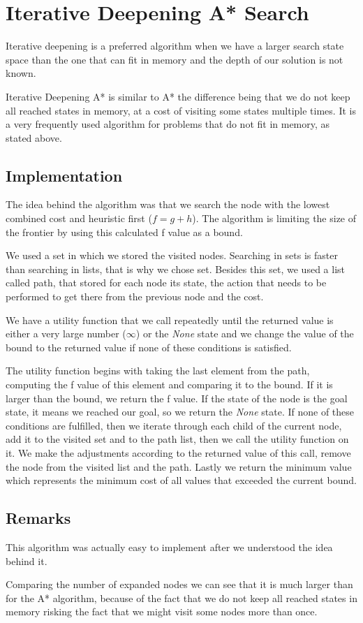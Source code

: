 \chapter{Iterative Deepening A* Search}
\label{sec:idastar}

Iterative deepening is a preferred algorithm when we have a larger search state space than the one that can fit in memory and the depth of our solution is not known. 

Iterative Deepening A* is similar to A* the difference being that we do not keep all reached states in memory, at a cost of visiting some states multiple times. It is a very frequently used algorithm for problems that do not fit in memory, as stated above.

\section{Implementation}

The idea behind the algorithm was that we search the node with the lowest combined cost and heuristic first ($f = g + h$). The algorithm is limiting the size of the frontier by using this calculated f value as a bound.

We used a set in which we stored the visited nodes. Searching in sets is faster than searching in lists, that is why we chose set.
Besides this set, we used a list called path, that stored for each node its state, the action that needs to be performed to get there from the previous node and the cost.

We have a utility function that we call repeatedly until the returned value is either a very large number ($\infty$)  or  the \textit{None} state and we change the value of the bound to the returned value if none of these conditions is satisfied. 

The utility function begins with taking the last element from the path, computing the f value of this element and comparing it to the bound. If it is larger than the bound, we return the f value. If the state of the node is the goal state, it means we reached our goal, so we return the \textit{None} state. If none of these conditions are fulfilled, then we iterate through each child of the current node, add it to the visited set and to the path list, then we call the utility function on it. We make the adjustments according to the returned value of this call, remove the node from the visited list and the path. 
Lastly we return the minimum value which represents the minimum cost of all values that exceeded the current bound. 

\section{Remarks}

This algorithm was actually easy to implement after we understood the idea behind it. 

Comparing the number of expanded nodes we can see that it is much larger than for the A* algorithm, because of the fact that we do not keep all reached states in memory risking the fact that we might visit some nodes more than once. 
